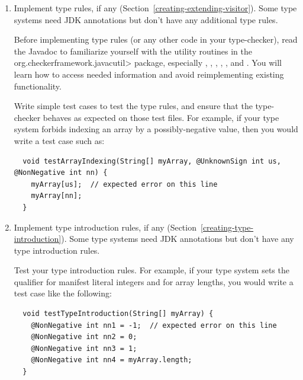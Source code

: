 \begin{enumerate}
  Write test cases for a few of the annotated JDK methods to ensure
  that the annotations are being properly read by your checker.

  If there are errors in the Checker Framework's ``all-systems'' tests, you can
  suppress them if they are expected. See \<framework/tests/all-systems/README>
  for more information.

\item
  Implement type rules, if any (Section~\ref{creating-extending-visitor}).
  Some type systems need JDK annotations but don't have any additional
  type rules.

  Before implementing type rules (or any other code in your type-checker),
  read the Javadoc to familiarize yourself with the utility routines in the
  \<org.checkerframework.javacutil> package, especially
  ,
  ,
  ,
  ,
  , and
  .
  You will learn how to access needed information and avoid
  reimplementing existing functionality.

  Write simple test cases to test the type rules, and ensure that the
  type-checker behaves as expected on those test files.
  For example, if your type system forbids indexing an array by a
  possibly-negative value, then you would write a test case such as:

\begin{Verbatim}
  void testArrayIndexing(String[] myArray, @UnknownSign int us, @NonNegative int nn) {
    myArray[us];  // expected error on this line
    myArray[nn];
  }
\end{Verbatim}

\item
  Implement type introduction rules, if any (Section~\ref{creating-type-introduction}).
  Some type systems need JDK annotations but don't have any type introduction rules.

  Test your type introduction rules.
  For example, if your type system sets the qualifier for manifest literal
  integers and for array lengths, you would write a test case like the following:

\begin{Verbatim}
  void testTypeIntroduction(String[] myArray) {
    @NonNegative int nn1 = -1;  // expected error on this line
    @NonNegative int nn2 = 0;
    @NonNegative int nn3 = 1;
    @NonNegative int nn4 = myArray.length;
  }
\end{Verbatim}


\end{enumerate}
